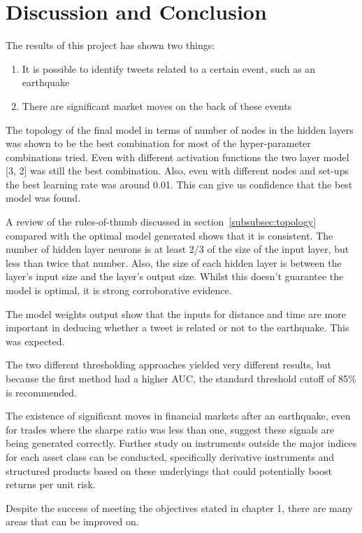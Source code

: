 \chapter{Discussion and Conclusion}

The results of this project has shown two things:

\begin{enumerate}
    \item It is possible to identify tweets related to a certain event, such as an earthquake
    \item There are significant market moves on the back of these events
\end{enumerate}

The topology of the final model in terms of number of nodes in the hidden layers was shown to be the best combination for most of the hyper-parameter combinations tried. Even with different activation functions the two layer model [3, 2] was still the best combination. Also, even with different nodes and set-ups the best learning rate was around 0.01. This can give us confidence that the best model was found.

A review of the rules-of-thumb discussed in section~\ref{subsubsec:topology} compared with the optimal model generated shows that it is consistent. The number of hidden layer neurons is at least 2/3 of the size of the input layer, but less than twice that number. Also, the size of each hidden layer is between the layer's input size and the layer's output size. Whilst this doesn't guarantee the model is optimal, it is strong corroborative evidence.

The model weights output show that the inputs for distance and time are more important in deducing whether a tweet is related or not to the earthquake. This was expected.

The two different thresholding approaches yielded very different results, but because the first method had a higher AUC, the standard threshold cutoff of 85\% is recommended.

The existence of significant moves in financial markets after an earthquake, even for trades where the sharpe ratio was less than one, suggest these signals are being generated correctly. Further study on instruments outside the major indices for each asset class can be conducted, specifically derivative instruments and structured products based on these underlyings that could potentially boost returns per unit risk.

\pagebreak
Despite the success of meeting the objectives stated in chapter 1, there are many areas that can be improved on.

